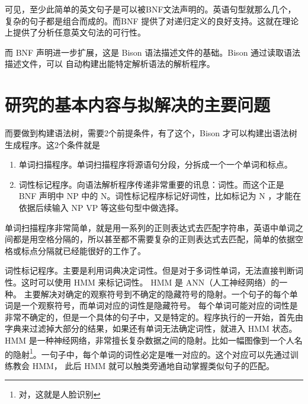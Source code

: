 \fbox{\begin{minipage}{12cm}
\vspace*{2ex}
ENDPUNC ::= '.' | '?' 

S ::= NP VP ENDPUNC | NP ENDPUNC | VP ENDPUNC | ...  < more >

NP ::= Det N | N  | Pron | < more >

Det ::= "the" | "an" | "a" | "this" | ... ...  < more >

V ::= "hit" | ...... < more >

N ::= "ball" | .... < more >

Pron ::= I | "you" | ..... <more>

.... <more>

\vspace*{2ex}
\end{minipage} }


可见，至少此简单的英文句子是可以被BNF文法声明的。英语句型就那么几个，复杂的句子都是组合而成的。而BNF
提供了对递归定义的良好支持。这就在理论上提供了分析任意英文句法的可行性。

而 BNF 声明进一步扩展，这是 Bison\cite{bison} 语法描述文件的基础。Bison 通过读取语法描述文件，可以
自动构建出能特定解析语法的解析程序。

\section{研究的基本内容与拟解决的主要问题}

而要做到构建语法树，需要2个前提条件，有了这个，Bison 才可以构建出语法树生成程序。这2个条件就是
\begin{enumerate}
\item 单词扫描程序。单词扫描程序将源语句分段，分拆成一个一个单词和标点。
\item 词性标记程序。向语法解析程序传递非常重要的讯息：词性。而这个正是 BNF 声明中 NP 中的 N。词性标记程序标记好词性，比如标记为 N ，才能在依据后续输入 NP VP 等这些句型中做选择。
\end{enumerate}

单词扫描程序非常简单，就是用一系列的正则表达式去匹配字符串，英语中单词之间都是用空格分隔的，所以甚至都不需要复杂的正则表达式去匹配，简单的依据空格或标点分隔就已经能很好的工作了。

词性标记程序。主要是利用词典决定词性。但是对于多词性单词，无法直接判断词性。这时可以使用 HMM\cite{HMM_Based_Part_Of_Speech_Tagging} 来标记词性。 HMM 是 ANN（人工神经网络）的一种。
主要解决对确定的观察符号到不确定的隐藏符号的隐射。一个句子的每个单词是一个观察符号，而单词对应的词性是隐藏符号。
每个单词可能对应的词性是非常不确定的，但是一个具体的句子中，又是特定的。程序执行的一开始，首先由字典来过滤掉大部分的结果，如果还有单词无法确定词性，就进入 HMM 状态。HMM 是一种神经网络，非常擅长复杂数据之间的隐射。比如一幅图像到一个人名的隐射\footnote{对，这就是人脸识别}。一句子中，每个单词的词性必定是唯一对应的。这个对应可以先通过训练教会 HMM， 此后 HMM 就可以触类旁通地自动掌握类似句子的匹配。

